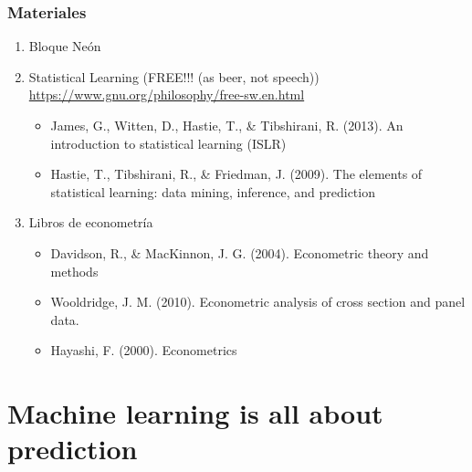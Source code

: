 \documentclass[
  shownotes,
  xcolor={svgnames},
  hyperref={colorlinks,citecolor=DarkBlue,linkcolor=andesred,urlcolor=DarkBlue}
  , aspectratio=169]{beamer}
\begin{document}
\begin{frame}
\frametitle{Materiales}


\begin{enumerate}
  \item Bloque Neón
  \medskip
  \item Statistical Learning (FREE!!! (as beer, not speech)) \url{https://www.gnu.org/philosophy/free-sw.en.html}
  \medskip
  \begin{itemize}
    \small
    \item James, G., Witten, D., Hastie, T., \& Tibshirani, R. (2013). An introduction to statistical learning (ISLR)
    \medskip
    \item Hastie, T., Tibshirani, R., \& Friedman, J. (2009). The elements of statistical learning: data mining, inference, and prediction
  \end{itemize}
  \medskip
  \item Libros de econometría
  \begin{itemize}
    \small
    \item Davidson, R., \& MacKinnon, J. G. (2004). Econometric theory and methods 
    \medskip
    \item Wooldridge, J. M. (2010). Econometric analysis of cross section and panel data. 
    \medskip
    \item Hayashi, F. (2000). Econometrics
  \end{itemize}
\bigskip
  \end{enumerate}





\end{frame}

\section{Machine learning is all about prediction}
\end{document}
